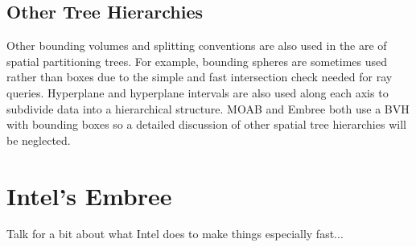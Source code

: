 \documentclass{anstrans}
\begin{document}
\subsection{Other Tree Hierarchies} 

Other bounding volumes and splitting conventions are also used in the are of spatial partitioning trees. For example, bounding spheres are sometimes used rather than boxes due to the simple and fast intersection check needed for ray queries. Hyperplane and hyperplane intervals are also used along each axis to subdivide data into a hierarchical structure. MOAB and Embree both use a BVH with bounding boxes so a detailed discussion of other spatial tree hierarchies will be neglected.


\section{Intel's Embree}

Talk for a bit about what Intel does to make things especially fast...




\end{document}

